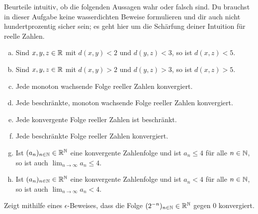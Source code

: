 \begin{aufg}
Beurteile intuitiv, ob die folgenden Aussagen wahr oder falsch sind. Du brauchst in dieser Aufgabe keine wasserdichten Beweise formulieren und dir auch nicht hundertprozentig sicher sein; es geht hier um die Schärfung deiner Intuition für reelle Zahlen.
\begin{enumerate}[a)]
 \item Sind $x,y,z\in {\mathbb R}$ mit $d(x,y)<2$ und $d(y,z)<3$, so ist $d(x,z)<5$.
 \item Sind $x,y,z\in {\mathbb R}$ mit $d(x,y)>2$ und $d(y,z)>3$, so ist $d(x,z)>5$.
  \item Jede monoton wachsende Folge reeller Zahlen konvergiert.
 \item Jede beschränkte, monoton wachsende Folge reeller Zahlen konvergiert.
  \item Jede konvergente Folge reeller Zahlen ist beschränkt.
 \item Jede beschränkte Folge reeller Zahlen konvergiert.
 \item Ist $(a_n)_{n\in {\mathbb N}}\in {\mathbb R}^{\mathbb N}$ eine konvergente Zahlenfolge und ist $a_n\leq 4$ für alle $n\in {\mathbb N}$, so ist auch $\lim_{n\to\infty} a_n\leq 4$.
 \item Ist $(a_n)_{n\in {\mathbb N}}\in {\mathbb R}^{\mathbb N}$ eine konvergente Zahlenfolge und ist $a_n <4$ für alle $n\in {\mathbb N}$, so ist auch $\lim_{n\to\infty} a_n<4$.
\end{enumerate}
\end{aufg}





\begin{aufg}[Konvergenzbeweis]
Zeigt mithilfe eines $\epsilon$-Beweises, dass die Folge $(2^{-n})_{n\in {\mathbb N}}\in {\mathbb R}^{\mathbb N}$ gegen $0$ konvergiert.
\end{aufg}








